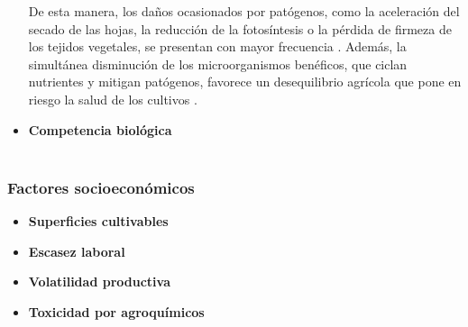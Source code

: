 \begin{itemize}[leftmargin=0cm, itemsep=0.5 cm]
	De esta manera, los daños ocasionados por patógenos, como la aceleración del secado de las hojas, la reducción de la fotosíntesis o la pérdida de firmeza de los tejidos vegetales, se presentan con mayor frecuencia \cite{Savary_2020}. Además, la simultánea disminución de los microorganismos benéficos, que ciclan nutrientes y mitigan patógenos, favorece un desequilibrio agrícola que pone en riesgo la salud de los cultivos \cite{Jansson_2020}.
	
	\item[]\textbf{Competencia biológica\\}\\
\end{itemize}




\subsubsection{Factores socioeconómicos}
\begin{itemize}[leftmargin=0cm, itemsep=0.5 cm]
\item[]\textbf{Superficies cultivables\\}
\item[]\textbf{Escasez laboral\\}
\item[]\textbf{Volatilidad productiva\\}
\item[]\textbf{Toxicidad por agroquímicos\\}
\end{itemize}